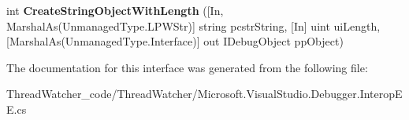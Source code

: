 \begin{DoxyCompactItemize}
\item 
\hypertarget{interface_microsoft_1_1_visual_studio_1_1_debugger_1_1_interop_e_e_1_1_i_debug_function_object2_a4778e96618b8504dab9e59065b8d7bbd}{int {\bfseries Create\+String\+Object\+With\+Length} (\mbox{[}In, Marshal\+As(Unmanaged\+Type.\+L\+P\+W\+Str)\mbox{]} string pcstr\+String, \mbox{[}In\mbox{]} uint ui\+Length, \mbox{[}Marshal\+As(Unmanaged\+Type.\+Interface)\mbox{]} out I\+Debug\+Object pp\+Object)}\label{interface_microsoft_1_1_visual_studio_1_1_debugger_1_1_interop_e_e_1_1_i_debug_function_object2_a4778e96618b8504dab9e59065b8d7bbd}

\end{DoxyCompactItemize}


The documentation for this interface was generated from the following file\+:\begin{DoxyCompactItemize}
\item 
Thread\+Watcher\+\_\+code/\+Thread\+Watcher/Microsoft.\+Visual\+Studio.\+Debugger.\+Interop\+E\+E.\+cs\end{DoxyCompactItemize}
